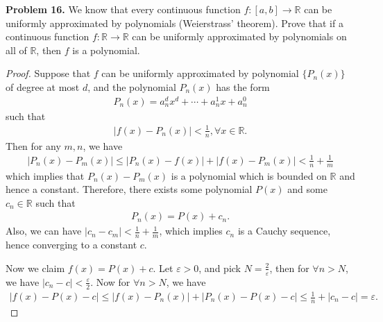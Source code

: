 \documentclass[12pt]{article}
\theoremstyle{definition}
\theoremstyle{definition}
\numberwithin{equation}{subsection}
\begin{document}
\noindent
{\bf Problem 16.}
We know that every continuous function $f:[a,b]\to\mathbb{R}$ can be uniformly approximated by polynomials (Weierstrass' theorem). Prove that if
a continuous function $f:\mathbb{R}\to\mathbb{R}$ can be uniformly approximated by polynomials on all of $\mathbb{R}$, then $f$ is a polynomial. 
\begin{proof}
Suppose that $f$ can be uniformly approximated by polynomial $\{P_n(x)\}$ of degree at most $d$, and the polynomial $P_n(x)$ has the form
\begin{align*}
    P_n(x) = a^d_n x^d + \cdots + a^1_n x + a^0_n
\end{align*}
such that 
\begin{align*}
    \left|f(x) - P_n(x)\right| < \frac{1}{n}, \forall x\in \mathbb{R}.
\end{align*}
Then for any $m,n$, we have
\begin{align*}
    \left|P_n(x) - P_m(x)\right| \leq \left|P_n(x) - f(x)\right| + \left|f(x) - P_m(x)\right| < \frac{1}{n} + \frac{1}{m}
\end{align*}
which implies that $P_n(x) - P_m(x)$ is a polynomial which is bounded on $\mathbb{R}$ and hence a constant. Therefore, there exists some polynomial $P(x)$ and some $c_n \in \mathbb{R}$ such that 
\begin{align*}
    P_n(x) = P(x) + c_n.
\end{align*}
Also, we can have $|c_n - c_m| < \frac{1}{n} + \frac{1}{m}$, which implies $c_n$ is a Cauchy sequence, hence converging to a constant $c$.

Now we claim $f(x) = P(x) + c$. Let $\varepsilon > 0$, and pick $N = \frac{2}{\varepsilon}$, then for $\forall n > N$, we have $|c_n - c| < \frac{\varepsilon}{2}$. Now for $\forall n > N$, we have 
\begin{align*}
    |f(x) - P(x) - c| \leq |f(x) - P_n(x)| + |P_n(x) - P(x) - c| \leq \frac{1}{n} + |c_n - c| = \varepsilon.
\end{align*}
\end{proof}

\medskip
\end{document}
